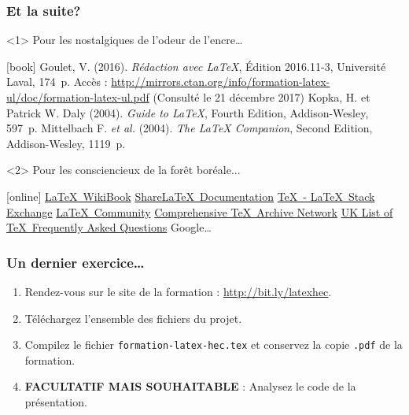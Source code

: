 \begin{frame}

	\frametitle{Et la suite?}
	
	\begin{onlyenv}
		Pour les nostalgiques de l'odeur de l'encre\dots
		
		\begin{thebibliography}{99}
			[book]
			 Goulet, V. (2016). \textit{Rédaction avec {\LaTeX}}, Édition 2016.11-3, Université Laval, 174~p. Accès : \href{http://mirrors.ctan.org/info/formation-latex-ul/doc/formation-latex-ul.pdf}{%
				http://mirrors.ctan.org/info/formation-latex-ul/doc/formation-latex-ul.pdf} (Consulté le 21 décembre 2017)
			 Kopka, H. et Patrick W. Daly (2004). \textit{Guide to {\LaTeX}}, Fourth Edition, Addison-Wesley, 597~p.
			 Mittelbach F. \textit{et al.} (2004). \textit{The {\LaTeX} Companion}, Second Edition, Addison-Wesley, 1119~p.
		\end{thebibliography}
	\end{onlyenv}

	\begin{onlyenv}
		Pour les consciencieux de la forêt boréale...
		
		\begin{thebibliography}{99}
			 \href{https://en.wikibooks.org/wiki/LaTeX}{\LaTeX\ WikiBook}
			 \href{https://fr.sharelatex.com/learn}{Share\LaTeX\ Documentation}
			 \href{https://tex.stackexchange.com/}{\TeX\ - \LaTeX\ Stack Exchange}
			 \href{http://latex.org/forum/}{\LaTeX\ Community}
			 \href{https://ctan.org/}{Comprehensive \TeX\ Archive Network}
			 \href{http://www.tex.ac.uk/}{UK List of \TeX\ Frequently Asked Questions}
			 Google\dots
		\end{thebibliography}
	\end{onlyenv}
\end{frame}


\begin{frame}[c]

	\frametitle{Un dernier exercice\dots}
	
	\begin{enumerate}
		\item Rendez-vous sur le site de la formation : \href{http://bit.ly/latexhec}{http://bit.ly/latexhec}.
		\item Téléchargez l'ensemble des fichiers du projet.
		\item Compilez le fichier \texttt{formation-latex-hec.tex} et conservez la copie \texttt{.pdf} de la formation.
		\item \textbf{FACULTATIF MAIS SOUHAITABLE} : Analysez le code de la présentation.
	\end{enumerate}
\end{frame}